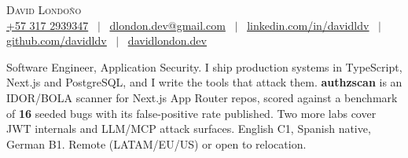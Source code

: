 



\begin{center}
    {\Large \scshape David Londoño} \\[2mm]
    \vspace{-1pt}
    \footnotesize
    \underline{+57 317 2939347} ~$|$~
    \underline{dlondon.dev@gmail.com} ~$|$~
    \href{https://www.linkedin.com/in/davidldv/}{\underline{linkedin.com/in/davidldv}} ~$|$~
    \href{https://github.com/davidldv}{\underline{github.com/davidldv}} ~$|$~
    \href{https://davidlondon.dev/}{\underline{davidlondon.dev}}
    \vspace{-4pt}
\end{center}
\vspace{-1pt}
\small{
Software Engineer, Application Security. I ship production systems in TypeScript, Next.js and PostgreSQL, and I write the tools that attack them. \textbf{authzscan} is an IDOR/BOLA scanner for Next.js App Router repos, scored against a benchmark of \textbf{16} seeded bugs with its false-positive rate published. Two more labs cover JWT internals and LLM/MCP attack surfaces. English C1, Spanish native, German B1. Remote (LATAM/EU/US) or open to relocation.
}
\vspace{-6pt}

